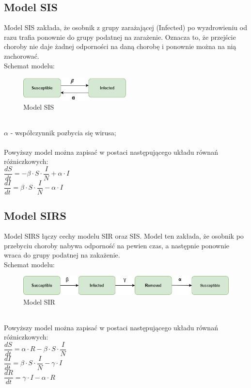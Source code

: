 \documentclass[12pt,a4paper]{article}
\begin{document}
\newpage
\subsection{Model SIS}
Model SIS zakłada, że osobnik z grupy zarażającej (Infected) po wyzdrowieniu od razu trafia ponownie do grupy podatnej na zarażenie. Oznacza to, że przejście choroby nie daje żadnej odporności na daną chorobę i ponownie można na nią zachorować.\\
Schemat modelu:
\begin{figure}[h!]
\centering
\includegraphics[width=0.5\textwidth]{Schematy/SIS}
\caption{Model SIS} 
\label{fig:Model SIS}
\end{figure}\\
\textit{$\alpha$} - współczynnik pozbycia się wirusa;\\\\
Powyższy model można zapisać w postaci następującego układu równań różniczkowych:\\
$\dfrac{dS}{dt} = -\beta\cdot{S}\cdot\dfrac{I}{N} + \alpha\cdot{I}$\\
$\dfrac{dI}{dt} = \beta\cdot{S}\cdot\dfrac{I}{N} - \alpha\cdot{I}$\\

\subsection{Model SIRS}
Model SIRS łączy cechy modelu SIR oraz SIS. Model ten zakłada, że osobnik po przebyciu choroby nabywa odporność na pewien czas, a następnie ponownie wraca do grupy podatnej na zakażenie.\\
Schemat modelu:
\begin{figure}[h!]
\centering
\includegraphics[width=1.0\textwidth]{Schematy/SIRS}
\caption{Model SIR} 
\label{fig:Model SIRS}
\end{figure}\\
Powyższy model można zapisać w postaci następującego układu równań różniczkowych:\\
$\dfrac{dS}{dt} =  \alpha\cdot{R} - \beta\cdot{S}\cdot\dfrac{I}{N}$\\
$\dfrac{dI}{dt} = \beta\cdot{S}\cdot\dfrac{I}{N} - \gamma\cdot{I}$\\
$\dfrac{dR}{dt} = \gamma\cdot{I} - \alpha\cdot{R}$
\end{document}
